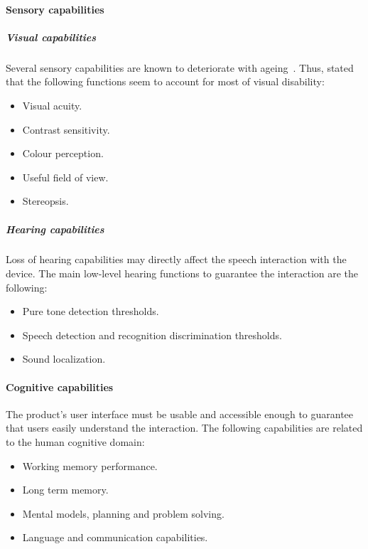 \paragraph*{Sensory capabilities}
\subparagraph*{Visual capabilities} Several sensory capabilities are known to 
deteriorate with ageing~\citep{persad_exploring_2006}. Thus, 
\citeauthor{persad_exploring_2006} stated that the following functions seem to 
account for most of visual disability:

\begin{itemize}
  \item Visual acuity.
  \item Contrast sensitivity.
  \item Colour perception.
  \item Useful field of view.
  \item Stereopsis.
\end{itemize}


\subparagraph*{Hearing capabilities} Loss of hearing capabilities may directly 
affect the speech interaction with the device. The main low-level hearing 
functions to guarantee the interaction are the following:

\begin{itemize}
  \item Pure tone detection thresholds.
  \item Speech detection and recognition discrimination thresholds.
  \item Sound localization.
\end{itemize}


\paragraph*{Cognitive capabilities}
The product's user interface must be usable and accessible enough to guarantee 
that users easily understand the interaction. The following capabilities are 
related to the human cognitive domain:

\begin{itemize}
 \item Working memory performance.
 \item Long term memory.
 \item Mental models, planning and problem solving.
 \item Language and communication capabilities.
\end{itemize}

